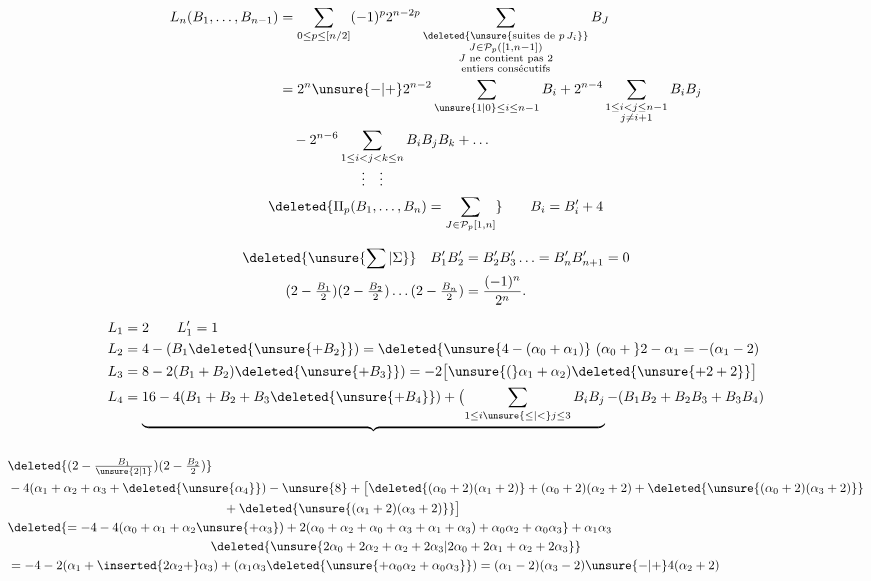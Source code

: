 \[
\begin{aligned}
L_n(B_1,\ldots,B_{n-1})
&=\sum_{0\le p\le[n/2]}(-1)^p2^{n-2p}
\sum_{\substack{\deleted{\unsure{\text{suites de }p\,J_i}}\\J\in\mathcal P_p([1,n-1])\\J\text{ ne contient pas 2}\\\text{entiers consécutifs}}} B_J\\
&=2^n\unsure{-|+}2^{n-2}\sum_{\unsure{1|0}\le i\le n-1}B_i
+2^{n-4}\sum_{\substack{1\le i<j\le n-1\\j\ne i+1}}B_iB_j\\
&\quad-2^{n-6}\sum_{\substack{1\le i<j<k\le n\\\vdots\quad\vdots}}B_iB_jB_k+\ldots
\end{aligned}
\]
\[
\deleted{\Pi_p(B_1,\ldots,B_n)=\sum_{J\in\mathcal P_p[1,n]}}\qquad B_i=B'_i+4
\]

\[
\begin{aligned}
\deleted{\unsure{\sum|\Sigma}}\quad B'_1B'_2&=B'_2B'_3\ldots=B'_nB'_{n+1}=0\\
(2-\tfrac{B_1}{2})(2-\tfrac{B_2}{2})\ldots(2-\tfrac{B_n}{2})&=\frac{(-1)^n}{2^{n}}.
\end{aligned}
\]

\[
\begin{aligned}
L_1&=2\qquad L'_1=1\\
L_2&=4-(B_1\deleted{\unsure{+B_2}})=\deleted{\unsure{4-(\alpha_0+\alpha_1)}\ (\alpha_0+{}}2-\alpha_1=-(\alpha_1-2)\\
L_3&=8-2(B_1+B_2)\deleted{\unsure{+B_3}})=-2\bigl[\unsure{(}\alpha_1+\alpha_2)\deleted{\unsure{+2+2}}\bigr]\\
L_4&=\underbrace{16-4(B_1+B_2+B_3\deleted{\unsure{+B_4}})+\bigl(\sum_{1\le i\unsure{\le|<}j\le3}B_iB_j}_{\phantom{16}}
-(B_1B_2+B_2B_3+B_3B_4)
\end{aligned}
\]

\[
\begin{aligned}
&\deleted{(2-\tfrac{B_1}{\unsure{2|1}})(2-\tfrac{B_2}{2})}\\
&-4(\alpha_1+\alpha_2+\alpha_3+\deleted{\unsure{\alpha_4}})-\unsure{8}+ \bigl[\deleted{(\alpha_0+2)(\alpha_1+2)}+(\alpha_0+2)(\alpha_2+2)+\deleted{\unsure{(\alpha_0+2)(\alpha_3+2)}}\\
&\hspace{17em}+\deleted{\unsure{(\alpha_1+2)(\alpha_3+2)}}\bigr]\\
&\deleted{=-4-4(\alpha_0+\alpha_1+\alpha_2\unsure{+\alpha_3})+2(\alpha_0+\alpha_2+\alpha_0+\alpha_3+\alpha_1+\alpha_3)+\alpha_0\alpha_2+\alpha_0\alpha_3}+\alpha_1\alpha_3\\
&\hspace{16em}\deleted{\unsure{2\alpha_0+2\alpha_2+\alpha_2+2\alpha_3|2\alpha_0+2\alpha_1+\alpha_2+2\alpha_3}}\\
&=-4-2(\alpha_1+\inserted{2\alpha_2+}\alpha_3)+(\alpha_1\alpha_3\deleted{\unsure{+\alpha_0\alpha_2+\alpha_0\alpha_3}})=(\alpha_1-2)(\alpha_3-2)\unsure{-|+}4(\alpha_2+2)
\end{aligned}
\]

